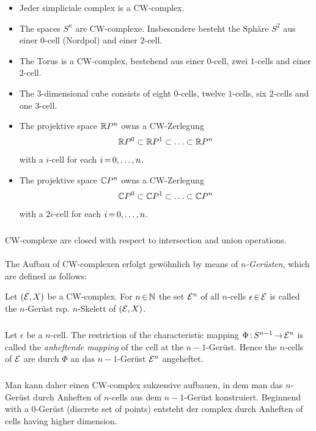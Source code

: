 \documentclass[11pt,twoside]{article}
\begin{document}
\begin{itemize}[leftmargin=22pt]
\item[1.]
Jeder simpliciale complex is a CW-complex.

\item[2.]
The spaces $S^n$ are CW-complexe.
Insbesondere besteht the Sph\"are $S^2$ aus einer $0$-cell (Nordpol) and
einer $2$-cell.

\item[3.]
The Torus is a CW-complex, bestehend aus einer $0$-cell, zwei $1$-cells
and einer $2$-cell.

\item[4.]
The $3$-dimensional cube consists of eight $0$-cells, twelve $1$-cells,
six $2$-cells and one $3$-cell.

\item[5.]
The projektive space $\R P^n$ owns a CW-Zerlegung
\[
\R P^0 \subset \R P^1 \subset \ldots \subset \R P^n
\]
with a $i$-cell for each $i \eq 0,\ldots,n$.

\item[6.]
The projektive space $\C P^n$ owns a CW-Zerlegung
\[
\C P^0 \subset \C P^1 \subset \ldots \subset \C P^n
\]
with a $2i$-cell for each $i \eq 0,\ldots,n$.
\end{itemize}

\subparagraph{}
CW-complexe are closed with respect to intersection and union operations.

\paragraph{}
The Aufbau of CW-complexen erfolgt gew\"ohnlich by means of \textit{$n$-Ger\"usten},
which are defined as follows:

\begin{definition} %
Let $(\cal{E},\topX)$ be a CW-complex.
For $n \xeof \N$ the set $\cal{E}^n$ of all $n$-cells $\epsilon
\xeof \cal{E}$ is called the  $n$-Ger\"ust rsp. $n$-Skelett of $(\cal{E},\topX)$.
\end{definition}

\subparagraph{}
Let $\epsilon$ be a $n$-cell.
The restriction of the characteristic mapping $\Phi \: S^{n-1} \xto \cal{E}^n$
is called the \textit{anheftende mapping} of the cell at the $n-1$-Ger\"ust.
Hence the $n$-cells of $\cal{E}$ are durch $\Phi$ an das $n-1$-Ger\"ust
$\cal{E}^n$ angeheftet.

\subparagraph{}
Man kann daher einen CW-complex sukzessive aufbauen,
in dem man das $n$-Ger\"ust durch Anheften of $n$-cells
aus dem $n-1$-Ger\"ust konstruiert.
Beginnend with a $0$-Ger\"ust (discrete set of points) entsteht der complex
durch Anheften of cells having higher dimension.
\end{document}
